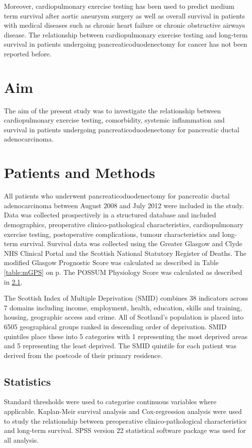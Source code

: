 Moreover, cardiopulmonary exercise testing has been used to predict medium term survival after aortic aneurysm surgery \parencite{carlisle_mid-term_2007} as well as overall survival in patients with medical diseases such as chronic heart failure or chronic obstructive airways disease. The relationship between cardiopulmonary exercise testing and long-term survival in patients undergoing pancreaticoduodenectomy for cancer has not been reported before. 

\section{Aim}
The aim of the present study was to investigate the relationship between cardiopulmonary exercise testing, comorbidity, systemic inflammation and survival in patients undergoing pancreaticoduodenectomy for pancreatic ductal adenocarcinoma.

\section{Patients and Methods}
All patients who underwent pancreaticoduodenectomy for pancreatic ductal adenocarcinoma between August 2008 and July 2012 were included in the study. Data was collected prospectively in a structured database and included demographics, preoperative clinico-pathological characteristics, cardiopulmonary exercise testing, postoperative complications, tumour characteristics and long-term survival. Survival data was collected using the Greater Glasgow and Clyde NHS Clinical Portal and the Scottish National Statutory Register of Deaths. The modified Glasgow Prognostic Score was calculated as described in Table \ref{table:mGPS} on p\pageref{table:mGPS}. The POSSUM Physiology Score was calculated as described in \ref{}. 

The Scottish Index of Multiple Deprivation (SMID) combines 38 indicators across 7 domains including  income, employment, health, education, skills and training, housing, geographic access and crime.  All of Scotland's population is placed into 6505 geographical groups ranked in descending order of deprivation. SMID quintiles place these into 5 categories with 1 representing the most deprived areas and 5 representing the least deprived. The SMID quintile for each patient was derived from the postcode of their primary residence.

\subsection{Statistics}
Standard thresholds were used to categorise continuous variables where applicable. Kaplan-Meir survival analysis and Cox-regression analysis were used to study the relationship between preoperative clinico-pathological characteristics and long-term survival. SPSS version 22 statistical software package was used for all analysis.



